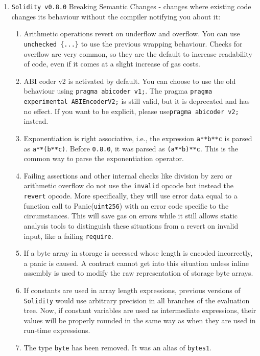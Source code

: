 \begin{enumerate}
\item \verb|Solidity v0.8.0| Breaking Semantic Changes - changes where existing code changes its behaviour without the compiler notifying you about it:
    \begin{enumerate}
	\item Arithmetic operations revert on underflow and overflow. You can use \verb|unchecked {...}| to use the previous wrapping behaviour. Checks for overflow are very common, so they are the default to increase readability of code, even if it comes at a slight increase of gas costs.
	\item ABI coder v2 is activated by default. You can choose to use the old behaviour using \verb|pragma abicoder v1;|. The pragma \verb|pragma experimental ABIEncoderV2;| is still valid, but it is deprecated and has no effect. If you want to be explicit, please use\linebreak\verb|pragma abicoder v2;| instead.
	\item Exponentiation is right associative, i.e., the expression \verb|a**b**c| is parsed as \verb|a**(b**c)|. Before \verb|0.8.0|, it was parsed as \verb|(a**b)**c|. This is the common way to parse the exponentiation operator.
	\item Failing assertions and other internal checks like division by zero or arithmetic overflow do not use the \verb|invalid| opcode but instead the \verb|revert| opcode. More specifically, they will use error data equal to a function call to Panic(\verb|uint256|) with an error code specific to the circumstances. This will save gas on errors while it still allows static analysis tools to distinguish these situations from a revert on invalid input, like a failing \verb|require|.
	\item If a byte array in storage is accessed whose length is encoded incorrectly, a panic is caused. A contract cannot get into this situation unless inline assembly is used to modify the raw representation of storage byte arrays.
	\item If constants are used in array length expressions, previous versions of \verb|Solidity| would use arbitrary precision in all branches of the evaluation tree. Now, if constant variables are used as intermediate expressions, their values will be properly rounded in the same way as when they are used in run-time expressions.
	\item The type \verb|byte| has been removed. It was an alias of \verb|bytes1|.
    \end{enumerate}


\end{enumerate}
